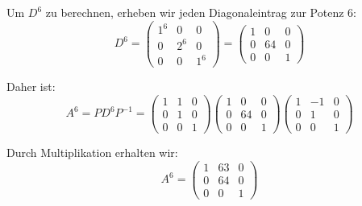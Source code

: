 {   Um \( D^6 \) zu berechnen, erheben wir jeden Diagonaleintrag zur Potenz 6:
   \[
   D^6 = \begin{pmatrix}
   1^6 & 0 & 0 \\
   0 & 2^6 & 0 \\
   0 & 0 & 1^6
   \end{pmatrix} = \begin{pmatrix}
   1 & 0 & 0 \\
   0 & 64 & 0 \\
   0 & 0 & 1
   \end{pmatrix}
   \]

   Daher ist:
   \[
   A^6 = P D^6 P^{-1} = \begin{pmatrix}
   1 & 1 & 0 \\
   0 & 1 & 0 \\
   0 & 0 & 1
   \end{pmatrix}
   \begin{pmatrix}
   1 & 0 & 0 \\
   0 & 64 & 0 \\
   0 & 0 & 1
   \end{pmatrix}
   \begin{pmatrix}
   1 & -1 & 0 \\
   0 & 1 & 0 \\
   0 & 0 & 1
   \end{pmatrix}
   \]

   Durch Multiplikation erhalten wir:
   \[
   A^6 = \begin{pmatrix}
   1 & 63 & 0 \\
   0 & 64 & 0 \\
   0 & 0 & 1
   \end{pmatrix}
   \]

}
